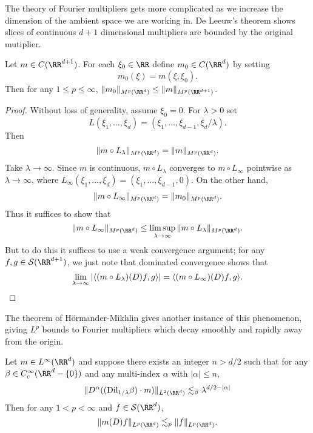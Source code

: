The theory of Fourier multipliers gets more complicated as we increase the dimension of the ambient space we are working in. De Leeuw's theorem shows slices of continuous $d+1$ dimensional multipliers are bounded by the original mutiplier.

\begin{theorem}
  Let $m \in C(\RR^{d+1})$. For each $\xi_0 \in \RR$ define $m_0 \in C(\RR^d)$ by setting
  \[ m_0(\xi) = m(\xi,\xi_0). \]
  Then for any $1 \leq p \leq \infty$, $\| m_0 \|_{M^p(\RR^d)} \leq \| m \|_{M^p(\RR^{d+1})}$.
\end{theorem}
\begin{proof}
  Without loss of generality, assume $\xi_0 = 0$. For $\lambda > 0$ set
  \[ L(\xi_1,\dots,\xi_d) = (\xi_1,\dots,\xi_{d-1},\xi_d/\lambda). \]
  Then
  \[ \| m \circ L_\lambda \|_{M^p(\RR^d)} = \| m \|_{M^p(\RR^d)}. \]
  Take $\lambda \to \infty$. Since $m$ is continuous, $m \circ L_\lambda$ converges to $m \circ L_\infty$ pointwise as $\lambda \to \infty$, where $L_\infty(\xi_1,\dots,\xi_d) = (\xi_1,\dots,\xi_{d-1},0)$. On the other hand,
  \[ \| m \circ L_\infty \|_{M^p(\RR^d)} = \| m_0 \|_{M^p(\RR^d)}. \]
  Thus it suffices to show that
  \[ \| m \circ L_\infty \|_{M^p(\RR^d)} \leq \limsup_{\lambda \to \infty} \| m \circ L_\lambda \|_{M^p(\RR^d)}. \]
  But to do this it suffices to use a weak convergence argument; for any $f,g \in \mathcal{S}(\RR^{d+1})$, we just note that dominated convergence shows that
  \[ \lim_{\lambda \to \infty} |\langle (m \circ L_\lambda)(D) f, g \rangle| = \langle (m \circ L_\infty)(D) f, g \rangle. \qedhere \]
\end{proof}

The theorem of H\"{o}rmander-Mikhlin gives another instance of this phenomenon, giving $L^p$ bounds to Fourier multipliers which decay smoothly and rapidly away from the origin.

\begin{theorem}
  Let $m \in L^\infty(\RR^d)$ and suppose there exists an integer $n > d/2$ such that for any $\beta \in C_c^\infty(\RR^d - \{ 0 \})$ and any multi-index $\alpha$ with $|\alpha| \leq n$,
  \[ \| D^\alpha( (\text{Dil}_{1/\lambda} \beta) \cdot m ) \|_{L^2(\RR^d)} \lesssim_\beta \lambda^{d/2-|\alpha|} \]
  Then for any $1 < p < \infty$ and $f \in \mathcal{S}(\RR^d)$,
  \[ \| m(D) f \|_{L^p(\RR^d)} \lesssim_p \| f \|_{L^p(\RR^d)}. \]
\end{theorem}

